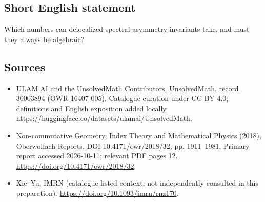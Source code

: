 \documentclass[11pt]{article}
\begin{document}
\subsection{Short English statement}
Which numbers can delocalized spectral-asymmetry invariants take, and must they always be algebraic?
\subsection{Sources}
\begin{itemize}
\item[\hypertarget{source:30003894:1}{S1}] ULAM.AI and the UnsolvedMath Contributors, UnsolvedMath, record 30003894 (OWR-16407-005). Catalogue curation under CC BY 4.0; definitions and English exposition added locally.
\url{https://huggingface.co/datasets/ulamai/UnsolvedMath}.
\item[\hypertarget{source:30003894:2}{S2}] Non-commutative Geometry, Index Theory and Mathematical Physics (2018), Oberwolfach Reports, DOI 10.4171/owr/2018/32, pp. 1911--1981. Primary report accessed 2026-10-11; relevant PDF pages 12.
\url{https://doi.org/10.4171/owr/2018/32}.
\item[\hypertarget{source:30003894:3}{S3}] Xie--Yu, IMRN (catalogue-listed context; not independently consulted in this preparation).
\url{https://doi.org/10.1093/imrn/rnz170}.
\end{itemize}
\label{end:30003894}
\end{document}
